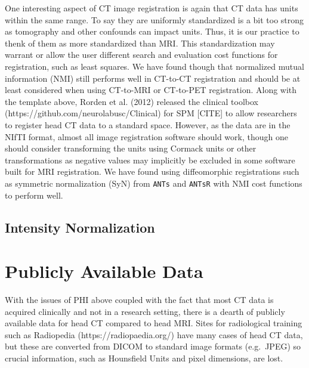 \documentclass[]{elsarticle} %
\begin{document}
One interesting aspect of CT image registration is again that CT data has units within the same range. To say they are uniformly standardized is a bit too strong as tomography and other confounds can impact units. Thus, it is our practice to thenk of them as more standardized than MRI. This standardization may warrant or allow the user different search and evaluation cost functions for registration, such as least squares. We have found though that normalized mutual information (NMI) still performs well in CT-to-CT registration and should be at least considered when using CT-to-MRI or CT-to-PET registration. Along with the template above, Rorden et al. (2012) released the clinical toolbox (https://github.com/neurolabusc/Clinical) for SPM {[}CITE{]} to allow researchers to register head CT data to a standard space. However, as the data are in the NIfTI format, almost all image registration software should work, though one should consider transforming the units using Cormack units or other transformations as negative values may implicitly be excluded in some software built for MRI registration. We have found using diffeomorphic registrations such as symmetric normalization (SyN) from \texttt{ANTs} and \texttt{ANTsR} with NMI cost functions to perform well.

\hypertarget{intensity-normalization}{%
\subsection{Intensity Normalization}\label{intensity-normalization}}

\hypertarget{publicly-available-data}{%
\section{Publicly Available Data}\label{publicly-available-data}}

With the issues of PHI above coupled with the fact that most CT data is acquired clinically and not in a research setting, there is a dearth of publicly available data for head CT compared to head MRI. Sites for radiological training such as Radiopedia (https://radiopaedia.org/) have many cases of head CT data, but these are converted from DICOM to standard image formats (e.g.~JPEG) so crucial information, such as Hounsfield Units and pixel dimensions, are lost.
\end{document}
